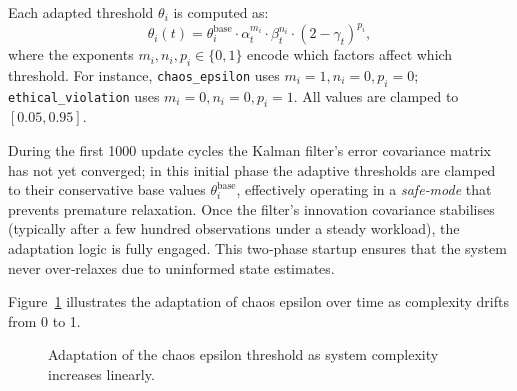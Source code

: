Each adapted threshold $\theta_i$ is computed as:
\[
\theta_i(t) = \theta_i^{\text{base}} \cdot \alpha_t^{m_i} \cdot \beta_t^{n_i} \cdot (2 - \gamma_t)^{p_i},
\]
where the exponents $m_i, n_i, p_i \in \{0,1\}$ encode which factors affect
which threshold.  For instance, \texttt{chaos\_epsilon} uses $m_i=1, n_i=0, p_i=0$;  
\texttt{ethical\_violation} uses $m_i=0, n_i=0, p_i=1$.  All values are
clamped to $[0.05, 0.95]$.

During the first 1000 update cycles the Kalman filter’s error covariance
matrix has not yet converged; in this initial phase the adaptive
thresholds are clamped to their conservative base values
$\theta_i^{\text{base}}$, effectively operating in a \emph{safe‑mode}
that prevents premature relaxation.  Once the filter’s innovation
covariance stabilises (typically after a few hundred observations under
a steady workload), the adaptation logic is fully engaged.  This
two‑phase startup ensures that the system never over‑relaxes due to
uninformed state estimates.

Figure~\ref{fig:adapt} illustrates the adaptation of chaos epsilon over time
as complexity drifts from 0 to 1.

\begin{figure}[htbp]
\centering
{}
\caption{Adaptation of the chaos epsilon threshold as system complexity increases linearly.}
\label{fig:adapt}
\end{figure}